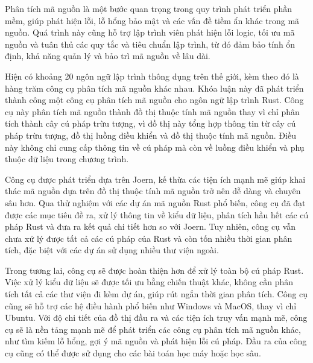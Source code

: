 Phân tích mã nguồn là một bước quan trọng trong quy trình phát triển phần mềm, giúp phát hiện lỗi, lỗ hổng bảo mật và các vấn đề tiềm ẩn khác trong mã nguồn.
Quá trình này cũng hỗ trợ lập trình viên phát hiện lỗi logic, tối ưu mã nguồn và tuân thủ các quy tắc và tiêu chuẩn lập trình, từ đó đảm bảo tính ổn định, khả năng quản lý và bảo trì mã nguồn về lâu dài.

Hiện có khoảng 20 ngôn ngữ lập trình thông dụng trên thế giới, kèm theo đó là hàng trăm công cụ phân tích mã nguồn khác nhau.
Khóa luận này đã phát triển thành công một công cụ phân tích mã nguồn cho ngôn ngữ lập trình Rust.
Công cụ này phân tích mã nguồn thành đồ thị thuộc tính mã nguồn thay vì chỉ phân tích thành cây cú pháp trừu tượng, vì đồ thị này tổng hợp thông tin từ cây cú pháp trừu tượng, đồ thị luồng điều khiển và đồ thị thuộc tính mã nguồn.
Điều này không chỉ cung cấp thông tin về cú pháp mà còn về luồng điều khiển và phụ thuộc dữ liệu trong chương trình.

Công cụ được phát triển dựa trên Joern, kế thừa các tiện ích mạnh mẽ giúp khai thác mã nguồn dựa trên đồ thị thuộc tính mã nguồn trở nên dễ dàng và chuyên sâu hơn.
Qua thử nghiệm với các dự án mã nguồn Rust phổ biến, công cụ đã đạt được các mục tiêu đề ra, xử lý thông tin về kiểu dữ liệu, phân tích hầu hết các cú pháp Rust và đưa ra kết quả chi tiết hơn so với Joern.
Tuy nhiên, công cụ vẫn chưa xử lý được tất cả các cú pháp của Rust và còn tốn nhiều thời gian phân tích, đặc biệt với các dự án sử dụng nhiều thư viện ngoài.

Trong tương lai, công cụ sẽ được hoàn thiện hơn để xử lý toàn bộ cú pháp Rust.
Việc xử lý kiểu dữ liệu sẽ được tối ưu bằng chiến thuật khác, không cần phân tích tất cả các thư viện đi kèm dự án, giúp rút ngắn thời gian phân tích.
Công cụ cũng sẽ hỗ trợ các hệ điều hành phổ biến như Windows và MacOS, thay vì chỉ Ubuntu.
Với độ chi tiết của đồ thị đầu ra và các tiện ích truy vấn mạnh mẽ, công cụ sẽ là nền tảng mạnh mẽ để phát triển các công cụ phân tích mã nguồn khác, như tìm kiếm lỗ hổng, gợi ý mã nguồn và phát hiện lỗi cú pháp.
Đầu ra của công cụ cũng có thể được sử dụng cho các bài toán học máy hoặc học sâu.
